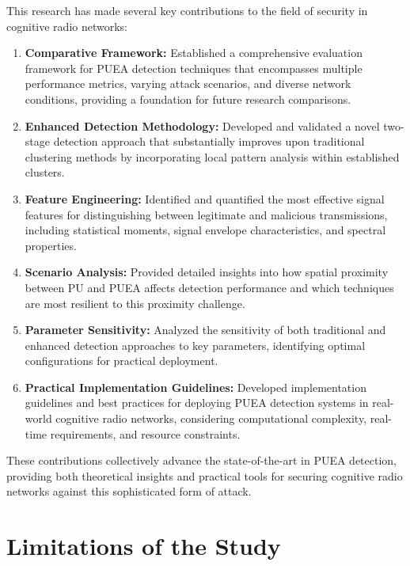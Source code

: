 This research has made several key contributions to the field of security in cognitive radio networks:

\begin{enumerate}
    \item \textbf{Comparative Framework:} Established a comprehensive evaluation framework for PUEA detection techniques that encompasses multiple performance metrics, varying attack scenarios, and diverse network conditions, providing a foundation for future research comparisons.

    \item \textbf{Enhanced Detection Methodology:} Developed and validated a novel two-stage detection approach that substantially improves upon traditional clustering methods by incorporating local pattern analysis within established clusters.

    \item \textbf{Feature Engineering:} Identified and quantified the most effective signal features for distinguishing between legitimate and malicious transmissions, including statistical moments, signal envelope characteristics, and spectral properties.

    \item \textbf{Scenario Analysis:} Provided detailed insights into how spatial proximity between PU and PUEA affects detection performance and which techniques are most resilient to this proximity challenge.

    \item \textbf{Parameter Sensitivity:} Analyzed the sensitivity of both traditional and enhanced detection approaches to key parameters, identifying optimal configurations for practical deployment.
    
    \item \textbf{Practical Implementation Guidelines:} Developed implementation guidelines and best practices for deploying PUEA detection systems in real-world cognitive radio networks, considering computational complexity, real-time requirements, and resource constraints.
\end{enumerate}

These contributions collectively advance the state-of-the-art in PUEA detection, providing both theoretical insights and practical tools for securing cognitive radio networks against this sophisticated form of attack.

\section{Limitations of the Study}

